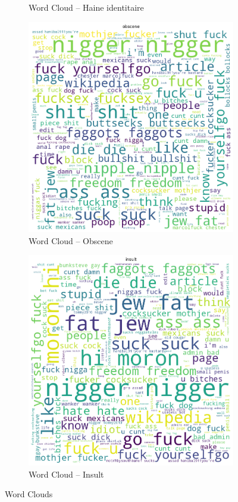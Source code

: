 \begin{figure}[h]
\begin{subfigure}{.5\textwidth}
        \caption{Word Cloud – Haine identitaire}
    \end{subfigure}
    \begin{subfigure}{.5\textwidth}
        \centering
        \includegraphics[width=.9\linewidth]{figures/word-cloud-obscene.png}
        \caption{Word Cloud – Obscene}
    \end{subfigure}%
    \begin{subfigure}{.5\textwidth}
        \centering
        \includegraphics[width=.9\linewidth]{figures/word-cloud-insult.png}
        \caption{Word Cloud – Insult}
    \end{subfigure}
    \caption{Word Clouds}
    \label{fig:word_clouds}
\end{figure}